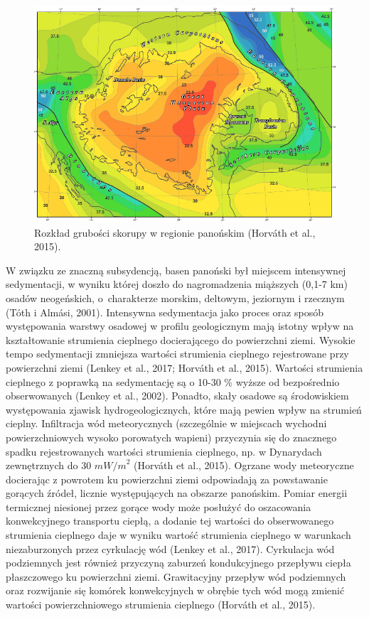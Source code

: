 \documentclass[11.5pt,twoside]{report}
\begin{document}
\begin{figure}[h]
	\centering
	\includegraphics[width=0.7\linewidth]{"../Termika/grubosc skorupy"}
	\caption{Rozkład grubości skorupy w regionie panońskim (Horváth et al., 2015).}
	\label{fig:grubosc-skorupy}
\end{figure}

 W związku ze znaczną subsydencją, basen panoński był miejscem intensywnej sedymentacji, w wyniku której doszło do nagromadzenia miąższych (0,1-7 km) osadów neogeńskich, o~charakterze morskim, deltowym, jeziornym i rzecznym (T\'{o}th i Alm\'{a}si, 2001). Intensywna sedymentacja jako proces oraz sposób występowania warstwy osadowej w profilu geologicznym mają istotny wpływ na kształtowanie strumienia cieplnego docierającego do powierzchni ziemi. Wysokie tempo sedymentacji zmniejsza wartości strumienia cieplnego rejestrowane przy powierzchni ziemi (Lenkey et al., 2017; Horv\'{a}th et al., 2015). Wartości strumienia cieplnego z poprawką na sedymentację są o 10-30 \% wyższe od bezpośrednio obserwowanych (Lenkey et al., 2002). Ponadto, skały osadowe są środowiskiem występowania zjawisk hydrogeologicznych, które mają pewien wpływ na strumień cieplny. Infiltracja wód meteorycznych (szczególnie w miejscach wychodni powierzchniowych wysoko porowatych wapieni) przyczynia się do znacznego spadku rejestrowanych wartości strumienia cieplnego, np. w Dynarydach zewnętrznych do 30 ${mW/m}^{2}$ (Horv\'{a}th et al., 2015). Ogrzane wody meteoryczne docierając z powrotem ku powierzchni ziemi odpowiadają za powstawanie gorących \'{z}ródeł, licznie występujących na obszarze panońskim. Pomiar energii termicznej niesionej przez gorące wody może posłużyć do oszacowania konwekcyjnego transportu ciepłą, a dodanie tej wartości do obserwowanego strumienia cieplnego daje w wyniku wartość strumienia cieplnego w warunkach niezaburzonych przez cyrkulację wód (Lenkey et al., 2017). Cyrkulacja wód podziemnych jest również przyczyną zaburzeń kondukcyjnego przepływu ciepła płaszczowego ku powierzchni ziemi. Grawitacyjny przepływ wód podziemnych oraz rozwijanie się komórek konwekcyjnych w obrębie tych wód mogą zmienić wartości powierzchniowego strumienia cieplnego (Horv\'{a}th et al., 2015). 
 
\end{document}
